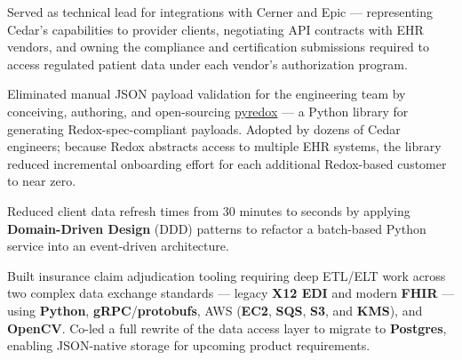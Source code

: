 

\begin{rExperience}

  \item Served as technical lead for integrations with Cerner and Epic --- representing Cedar's capabilities to provider
    clients, negotiating API contracts with EHR vendors, and owning the compliance and certification submissions
    required to access regulated patient data under each vendor's authorization program.

  \item Eliminated manual JSON payload validation for the engineering team by conceiving, authoring, and open-sourcing
    \href{https://github.com/cedar-team/pyredox}{pyredox} --- a Python library for generating Redox-spec-compliant
    payloads. Adopted by dozens of Cedar engineers; because Redox abstracts access to multiple EHR systems, the library
    reduced incremental onboarding effort for each additional Redox-based customer to near zero.

  \item Reduced client data refresh times from 30 minutes to seconds by applying \textbf{Domain-Driven Design} (DDD)
    patterns to refactor a batch-based Python service into an event-driven architecture.

  \item Built insurance claim adjudication tooling requiring deep ETL/ELT work across two complex data exchange
    standards --- legacy \textbf{X12 EDI} and modern \textbf{FHIR} --- using \textbf{Python},
    \textbf{gRPC}/\textbf{protobufs}, AWS (\textbf{EC2}, \textbf{SQS}, \textbf{S3}, and \textbf{KMS}), and
    \textbf{OpenCV}. Co-led a full rewrite of the data access layer to migrate to \textbf{Postgres}, enabling
    JSON-native storage for upcoming product requirements.



\end{rExperience}

